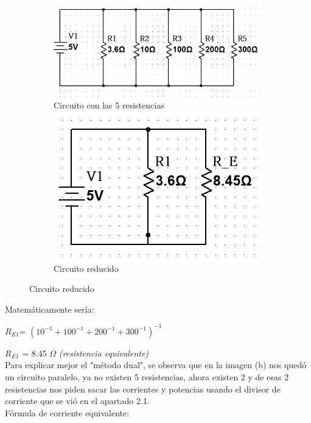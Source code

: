 \documentclass[a4paper,11pt]{article}
\begin{document}
\begin{enumerate}
    \begin{figure}[H]
        \centering
        \begin{subfigure}{0.4\textwidth}
            \includegraphics[width=0.9\linewidth]{images/ejercicio.PNG}
            \caption{Circuito con las 5 resistencias}
        \end{subfigure}
        \begin{subfigure}{0.3\textwidth}
            \includegraphics[width=0.9\linewidth]{images/ej.PNG}
            \caption{Circuito reducido}
        \end{subfigure}
    \end{figure}
    \noindent Matemáticamente sería:

    $R_{E1}$= $(10^{-1} + 100^{-1} + 200^{-1} + 300^{-1} )^{-1}$

    $R_{E1}$ = 8.45 $\Omega$ \textit{(resistencia equivalente)}
    \vspace{0.3cm}\\
    \noindent Para explicar mejor el "método dual", se observa que en la imagen (b) nos quedó un circuito paralelo, ya no existen 5 resistencias, ahora existen 2 y de esas 2 resistencias nos piden sacar las corrientes y potencias usando el divisor de corriente que se vió en el apartado 2.1.
    \vspace{0.3cm}\\
    Fórmula de corriente equivalente:


\end{enumerate}
\end{document}
